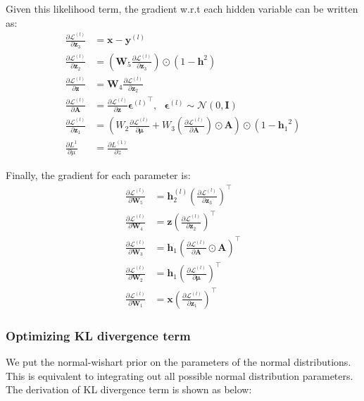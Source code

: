 Given this likelihood term, the gradient w.r.t each hidden variable can be written as:
\begin{align}
\frac{\partial \mathcal{L}^{(l)}}{\partial \mathbf{z}_3} &= \mathbf{x}-\mathbf{y}^{(l)} \\
\frac{\partial \mathcal{L}^{(l)}}{\partial \mathbf{z}_2} &= (\mathbf{W}_5 \frac{\partial \mathcal{L}^{(l)}}{\partial \mathbf{z}_3}) \odot (1-\mathbf{h}^2)\\
\frac{\partial \mathcal{L}^{(l)}}{\partial \mathbf{z}} &= \mathbf{W}_4 \frac{\partial \mathcal{L}^{(l)}}{\partial \mathbf{z}_2}\\
\frac{\partial \mathcal{L}^{(l)}}{\partial \mathbf{A}} &= \frac{\partial \mathcal{L}^{(l)}}{\partial \mathbf{z}} {\mathbf{\epsilon}^{(l)}}^{\top}, ~~~  \mathbf{\epsilon}^{(l)} \sim \mathcal{N}(0, \mathbf{I}) \\
\frac{\partial \mathcal{L}^{(l)}}{\partial \mathbf{z}_1}&=(W_2\frac{\partial \mathcal{L}^{(l)}}{\partial \mathbf{\mu}}+W_3(\frac{\partial \mathcal{L}^{(l)}}{\partial \mathbf{A}})\odot \mathbf{A}) \odot (1-{\mathbf{h}_1}^2)\\
\frac{\partial L^{1}}{\partial \mu}&= \frac{\partial L^{(1)}}{\partial z}
\end{align}

Finally, the gradient for each parameter is:
\begin{align}
\frac{\partial \mathcal{L}^{(l)}}{\partial \mathbf{W}_5}&=\mathbf{h}_2^{(l)} (\frac{\partial \mathcal{L}^{(l)}}{\partial \mathbf{z}_3})^{\top} \\
\frac{\partial \mathcal{L}^{(l)}}{\partial \mathbf{W}_4} &= \mathbf{z}(\frac{\partial \mathcal{L}^{(l)}}{\partial \mathbf{z}_2})^{\top}\\
\frac{\partial \mathcal{L}^{(l)}}{\partial \mathbf{W}_3} &= \mathbf{h}_1 (\frac{\partial \mathcal{L}^{(l)}}{\partial \mathbf{A}}\odot \mathbf{A} )^{\top}\\
\frac{\partial \mathcal{L}^{(l)}}{\partial \mathbf{W}_2} &= \mathbf{h}_1 (\frac{\partial \mathcal{L}^{(l)}}{\partial \mathbf{\mu}})^{\top}\\
\frac{\partial \mathcal{L}^{(l)}}{\partial \mathbf{W}_1} &= \mathbf{x}(\frac{\partial \mathcal{L}^{(l)}}{\partial \mathbf{z}_1})^{\top}
\end{align}


\subsubsection{Optimizing KL divergence term}
We put the normal-wishart prior on the parameters of the normal distributions. This is equivalent to integrating out all possible normal distribution parameters. The derivation of KL divergence term is shown as below:

